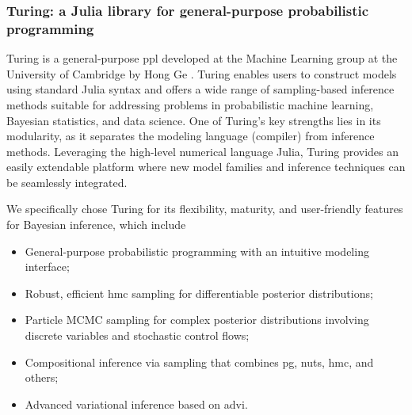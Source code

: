 \subsubsection{Turing: a Julia library for general-purpose probabilistic programming}

Turing is a general-purpose \ac{ppl} developed at the Machine Learning group at the University of Cambridge by Hong Ge \citep{ge_turing_2018}. Turing enables users to construct models using standard Julia syntax and offers a wide range of sampling-based inference methods suitable for addressing problems in probabilistic machine learning, Bayesian statistics, and data science. One of Turing's key strengths lies in its modularity, as it separates the modeling language (compiler) from inference methods. Leveraging the high-level numerical language Julia, Turing provides an easily extendable platform where new model families and inference techniques can be seamlessly integrated.

We specifically chose Turing for its flexibility, maturity, and user-friendly features for Bayesian inference, which include
\begin{itemize}
    \item General-purpose probabilistic programming with an intuitive modeling interface;
    \item Robust, efficient \ac{hmc} sampling for differentiable posterior distributions;
    \item Particle MCMC sampling for complex posterior distributions involving discrete variables and stochastic control flows;
    \item Compositional inference via sampling that combines \ac{pg}, \ac{nuts}, \ac{hmc}, and others;
    \item Advanced variational inference based on \ac{advi}.
\end{itemize}



